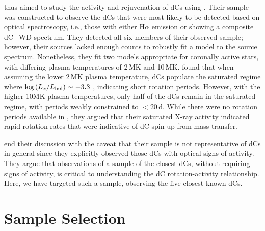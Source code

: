 \documentclass[twocolumn, tighten, times, astrosymb]{aastex631}
\begin{document}
\citet{Green2019} thus aimed to study the activity and rejuvenation of dCs using \Chandra. Their sample was constructed to observe the dCs that were most likely to be detected based on optical spectroscopy, i.e., those with either H$\alpha$ emission or showing a composite dC+WD spectrum. They detected all six members of their observed sample; however, their sources lacked enough counts to robustly fit a model to the source spectrum. Nonetheless, they fit two models appropriate for coronally active stars, with differing plasma temperatures of 2\,MK and 10\,MK. \citet{Green2019} found that when assuming the lower 2\,MK plasma temperature, dCs populate the saturated regime where $\log{(\LxLbol)} \sim -3.3$ \citep[e.g.,][]{Wright2011}, indicating short rotation periods. However, with the higher 10MK plasma temperatures, only half of the dCs remain in the saturated regime, with periods weakly constrained to $< 20$\,d. While there were no rotation periods available in \citet{Green2019}, they argued that their saturated X-ray activity indicated rapid rotation rates that were indicative of dC spin up from mass transfer. 

\citet{Green2019} end their discussion with the caveat that their sample is not representative of dCs in general since they explicitly observed those dCs with optical signs of activity. They argue that observations of a sample of the closest dCs, without requiring signs of activity, is critical to understanding the dC rotation-activity relationship. Here, we have targeted such a sample, observing the five closest known dCs.

\section{Sample Selection}\label{sec:sample}

\end{document}
